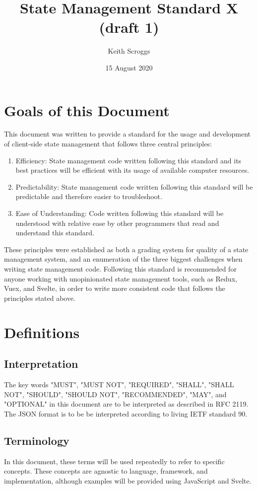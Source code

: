 \documentclass{article}
\title{State Management Standard X (draft 1)}
\author{Keith Scroggs}
\date{15 August 2020}
\begin{document}
\maketitle

\tableofcontents
\renewcommand{\lstlistlistingname}{Code Examples}
\lstlistoflistings
\newpage

\section{Goals of this Document}
This document was written to provide a standard for the usage and development of client-side state management that follows three central principles:
\begin{enumerate}
    \item Efficiency: State management code written following this standard and its best practices will be efficient with its usage of available computer resources.
    \item Predictability: State management code written following this standard will be predictable and therefore easier to troubleshoot.
    \item Ease of Understanding: Code written following this standard will be understood with relative ease by other programmers that read and understand this standard.
\end{enumerate}
These principles were established as both a grading system for quality of a state management system, and an enumeration of the three biggest challenges when writing state management code. Following this standard is recommended for anyone working with unopinionated state management tools, such as Redux, Vuex, and Svelte, in order to write more consistent code that follows the principles stated above.

\section{Definitions}

\subsection{Interpretation}
The key words "MUST", "MUST NOT", "REQUIRED", "SHALL", "SHALL NOT", "SHOULD", "SHOULD NOT", "RECOMMENDED", "MAY", and "OPTIONAL" in this document are to be interpreted as described in RFC 2119. The JSON format is to be be interpreted according to living IETF standard 90.

\subsection{Terminology}
In this document, these terms will be used repeatedly to refer to specific concepts. These concepts are agnostic to language, framework, and implementation, although examples will be provided using JavaScript and Svelte. 
\end{document}
